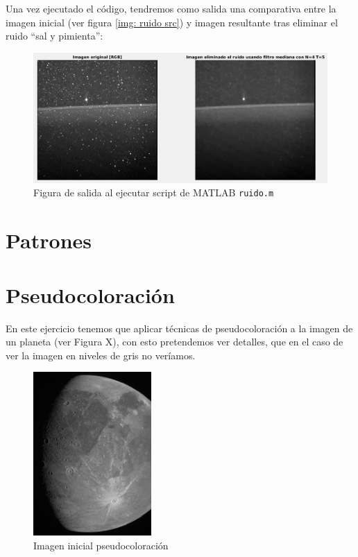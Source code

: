 \documentclass[12pt]{article}
\begin{document}
	\vspace{10px}

	\noindent Una vez ejecutado el código, tendremos como salida una comparativa entre la imagen inicial (ver figura \ref{img: ruido src}) y imagen resultante tras eliminar el ruido ``sal y pimienta'':
	
	\begin{figure}[h]
		\begin{center}
			\includegraphics[width=1\textwidth]{img/ruido_output.png}
			\caption{Figura de salida al ejecutar script de MATLAB \texttt{ruido.m}}
			\label{img: ruido output}
		\end{center}
	\end{figure}
	
	\pagebreak
	
	\section{Patrones}
	
	\pagebreak
	
	\section{Pseudocoloración}
	
	\noindent En este ejercicio tenemos que aplicar técnicas de pseudocoloración a la imagen de un planeta (ver Figura X), con esto pretendemos ver detalles, que en el caso de ver la imagen en niveles de gris no veríamos.
	
	\begin{figure}[h]
		\begin{center}
			\includegraphics[width=0.4\textwidth]{img/pseudocoloracion.jpg}
			\caption{Imagen inicial pseudocoloración}
			\label{img: pseudocoloración src}
		\end{center}
	\end{figure}
\end{document}
